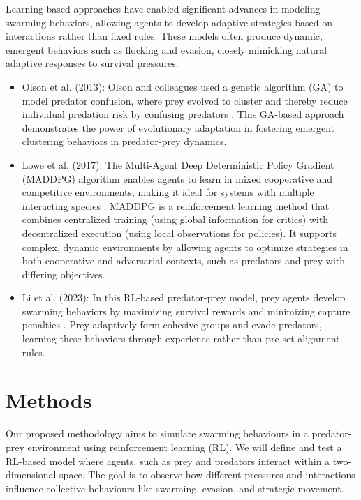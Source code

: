 \documentclass[9pt]{pnas-new}
\begin{document}
Learning-based approaches have enabled significant advances in modeling swarming behaviors, allowing agents to develop adaptive strategies based on interactions rather than fixed rules. These models often produce dynamic, emergent behaviors such as flocking and evasion, closely mimicking natural adaptive responses to survival pressures.

\begin{itemize}
    \item Olson et al. (2013): Olson and colleagues used a genetic algorithm (GA) to model predator confusion, where prey evolved to cluster and thereby reduce individual predation risk by confusing predators \cite{olson2013predator}. This GA-based approach demonstrates the power of evolutionary adaptation in fostering emergent clustering behaviors in predator-prey dynamics.
    \item Lowe et al. (2017): The Multi-Agent Deep Deterministic Policy Gradient (MADDPG) algorithm enables agents to learn in mixed cooperative and competitive environments, making it ideal for systems with multiple interacting species \cite{lowe2017}. MADDPG is a reinforcement learning method that combines centralized training (using global information for critics) with decentralized execution (using local observations for policies). It supports complex, dynamic environments by allowing agents to optimize strategies in both cooperative and adversarial contexts, such as predators and prey with differing objectives.
    \item Li et al. (2023): In this RL-based predator-prey model, prey agents develop swarming behaviors by maximizing survival rewards and minimizing capture penalties \cite{li2023predator}. Prey adaptively form cohesive groups and evade predators, learning these behaviors through experience rather than pre-set alignment rules.
\end{itemize}


\section*{Methods}

Our proposed methodology aims to simulate swarming behaviours in a predator-prey environment using reinforcement learning (RL). 
We will define and test a RL-based model where agents, such as prey and predators interact within a two-dimensional space. The goal is to observe how different pressures and interactions influence collective behaviours like swarming, evasion, and strategic movement.
\end{document}
